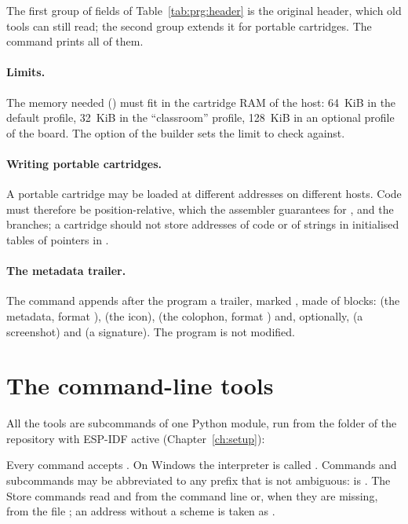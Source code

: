 The first group of fields of Table~\ref{tab:prg:header} is the original
header, which old tools can still read; the second group extends it for
portable cartridges. The command  prints all of them.

\paragraph{Limits.} The memory needed () must fit in the
cartridge RAM of the host: 64~KiB in the default profile, 32~KiB in the
``classroom'' profile, 128~KiB in an optional profile of the board. The
option  of the builder sets the limit to check
against.

\paragraph{Writing portable cartridges.} A portable cartridge may be loaded
at different addresses on different hosts. Code must therefore be
position-relative, which the assembler guarantees for , 
and the branches; a cartridge should not store addresses of code or of
strings in initialised tables of pointers in .

\paragraph{The metadata trailer.} The command 
appends after the program a trailer, marked , made of blocks:
 (the metadata, format ), 
(the icon),  (the colophon, format ) and,
optionally,  (a screenshot) and  (a signature). The
program is not modified.

\section{The command-line tools}

All the tools are subcommands of one Python module, run from the folder of
the \prg repository with ESP-IDF active (Chapter~\ref{ch:setup}):
\begin{center}\end{center}
Every command accepts . On Windows the interpreter is called
. Commands and subcommands may be abbreviated to any prefix that
is not ambiguous:  is . The
Store commands read  and  from the command
line or, when they are missing, from the file ;
an address without a scheme is taken as .

